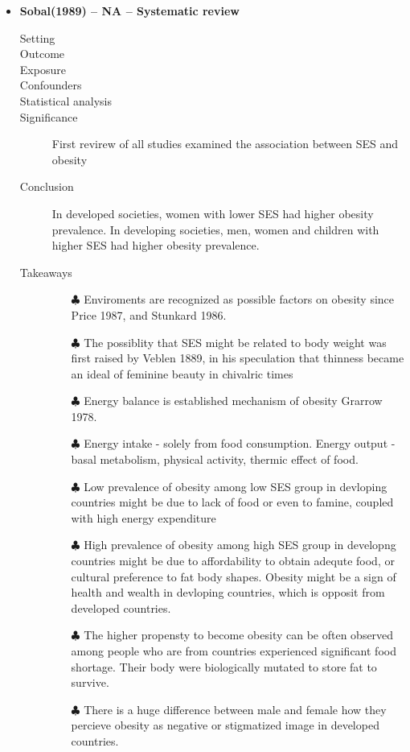 \documentclass{article}
\begin{document}
\begin{itemize}
\item{\bf Sobal(1989) -- NA -- Systematic review}
		\begin{description}
			\item[Setting] 
			\item[Outcome] 
			\item[Exposure] 
			\item[Confounders] 
			\item[Statistical analysis] 
			\item[Significance] First revirew of all studies examined the association between SES and obesity
			\item[Conclusion] In developed societies, women with lower SES had higher obesity prevalence. In developing societies, men, women and children with higher SES had higher obesity prevalence.
			\item[Takeaways] 
				\begin{itemize}\mbox{}\par
					\item[$\clubsuit$] Enviroments are recognized as possible factors on obesity since Price 1987, and Stunkard 1986.
					\item[$\clubsuit$] The possiblity that SES might be related to body weight was first raised by Veblen 1889, in his speculation that thinness became an ideal of feminine beauty in chivalric times
					\item[$\clubsuit$] Energy balance is established mechanism of obesity Grarrow 1978.
					\item[$\clubsuit$] Energy intake - solely from food consumption. Energy output - basal metabolism, physical activity, thermic effect of food.
					\item[$\clubsuit$] Low prevalence of obesity among low SES group in devloping countries might be due to lack of food or even to famine, coupled with high energy expenditure 
					\item[$\clubsuit$] High prevalence of obesity among high SES group in developng countries might be due to affordability to obtain adequte food, or cultural preference to fat body shapes. Obesity might be a sign of health and wealth in devloping countries, which is opposit from developed countries.
					\item[$\clubsuit$] The higher propensty to become obesity can be often observed among people who are from countries experienced significant food shortage. Their body were biologically mutated to store fat to survive.   
					\item[$\clubsuit$] There is a huge difference between male and female how they percieve obesity as negative or stigmatized image in developed countries. 
				\end{itemize} 
		\end{description}

\end{itemize} %
\end{document}
